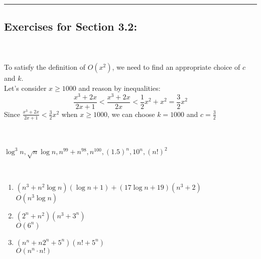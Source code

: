 \documentclass[12pt]{article}  %
\begin{document}
\rule{6in}{.1pt}       %





\subsection*{Exercises for Section 3.2:}     

\\
\\
To satisfy the definition of $O(x^2)$, we need to find an appropriate choice of $c$ and $k$.\\
Let’s consider $x\geq1000$ and reason by inequalities:
\[\frac{x^3+2x}{2x+1}<\frac{x^3+2x}{2x}<\frac{1}{2}x^2+x^2=\frac{3}{2}x^2\]
Since $\displaystyle\frac{x^3+2x}{2x+1}<\frac{3}{2}x^2$ when $x\geq1000$, we can choose $k=1000$ and $c=\frac{3}{2}$

\\
\\
$\log^3{n},\sqrt{n}\log{n},n^{99}+n^{98}, n^{100},(1.5)^n,10^n,(n!)^2$

\\
\begin{enumerate}
    \item $(n^3+n^2\log{n})(\log{n}+1)+(17\log{n}+19)(n^3+2)$\\
    $O(n^3\log{n})$
    \item $(2^n+n^2)(n^3+3^n)$\\
    $O(6^n)$
    \item $(n^n+n2^n+5^n)(n!+5^n)$\\
    $O(n^n\cdot n!)$
\end{enumerate}
\end{document}
